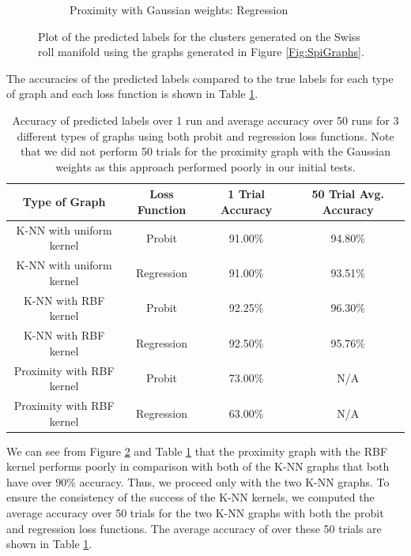 \documentclass[12pt]{amsart}
\begin{document}
\begin{figure}[ht]
\begin{subfigure}{0.475\linewidth}
    \caption{Proximity with Gaussian weights: Regression} 
    \label{Fig:SpiProxReg} 
  \end{subfigure}
  \caption{Plot of the predicted labels for the clusters generated on the Swiss roll manifold using the graphs generated in Figure \ref{Fig:SpiGraphs}. }
  \label{Fig:SpiPred} 
\end{figure}
The accuracies of the predicted labels compared to the true labels for each type of graph and each loss function is shown in Table \ref{Table:SpiRes}.

\begin{table}
\begin{center}
\begin{tabular}{||c c c c||} 
 \hline
 Type of Graph & Loss Function & 1 Trial Accuracy & 50 Trial Avg. Accuracy\\ 
 \hline\hline
 K-NN with uniform kernel & Probit & 91.00\% & 94.80\%\\ 
 \hline
 K-NN with uniform kernel & Regression & 91.00\% & 93.51\%\\
 \hline
 K-NN with RBF kernel & Probit & 92.25\% & 96.30\%\\
 \hline
 K-NN with RBF kernel & Regression & 92.50\% & 95.76\%\\
 \hline
 Proximity with RBF kernel & Probit & 73.00\% & N/A\\
 \hline
 Proximity with RBF kernel & Regression & 63.00\% & N/A\\
 \hline
\end{tabular}
\caption{Accuracy of predicted labels over 1 run and average accuracy over 50 runs for 3 different types of graphs using both probit and regression loss functions. Note that we did not perform 50 trials for the proximity graph with the Gaussian weights as this approach performed poorly in our initial tests.}
\label{Table:SpiRes}
\end{center}
\end{table}
We can see from Figure \ref{Fig:SpiPred} and Table \ref{Table:SpiRes} that the proximity graph with the RBF kernel performs poorly in comparison with both of the K-NN graphs that both have over $90\%$ accuracy. Thus, we proceed only with the two K-NN graphs. To ensure the consistency of the success of the K-NN kernels, we computed the average accuracy over 50 trials for the two K-NN graphs with both the probit and regression loss functions. The average accuracy of over these 50 trials are shown in Table \ref{Table:SpiRes}. 
\end{document}
